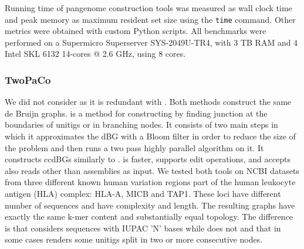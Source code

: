 Running time of pangenome construction tools was measured as wall clock time and peak memory as maximum resident set size using the \texttt{time} command. Other metrics were obtained with custom Python scripts. All benchmarks were performed on a Supermicro Superserver SYS-2049U-TR4, with 3 TB RAM and 4 Intel SKL 6132 14-cores @ 2.6 GHz, using 8 cores. \\

\subsubsection*{\textbf{TwoPaCo}}
\label{app:twopaco}
We did not consider \twopaco as it is redundant with \bifrost. Both methods construct the same de Bruijn graphs.
\twopaco is a method for constructing \ccdbgs by finding junction \kmers at the boundaries of unitigs or in branching nodes. It consists of two main steps in which it approximates the dBG with a Bloom filter in order to reduce the size of the problem and then runs a two pass highly parallel algorithm on it. It constructs ccdBGs similarly to \bifrost. \bifrost  is faster, supports edit operations, and accepts also reads other than assemblies as input. We tested both tools on NCBI datasets from three different known human variation regions part of the human leukocyte antigen (HLA) complex: HLA-A, MICB and TAP1. These loci have different number of sequences and have complexity and length. The resulting graphs have exactly the same k-mer content and substantially equal topology. The difference is that \twopaco considers sequences with IUPAC 'N' bases while \bifrost does not and that in some cases \twopaco renders some unitigs split in two or more consecutive nodes.

